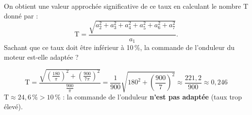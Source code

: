 \documentclass[11pt,a4paper]{article}
\newcommand{\cor}[1]{%
  \begin{tcolorbox}[
    colback=blue!5!white,
    colframe=blue!70!black,
    boxrule=1pt,
    arc=3pt,
    left=4pt, right=4pt, top=3pt, bottom=3pt,
    before skip=2mm, after skip=3mm
  ]
  \color{blue!80!black}#1
  \end{tcolorbox}%
}
\begin{document}
\begin{enumerate}
\begin{enumerate}
On obtient une valeur approchée significative de ce taux en calculant le nombre T donné par :
\[\text{T} = \dfrac{\sqrt{a_2^2+a_3^2+a_4^2+a_5^2+a_6^2+a_7^2}}{a_1}.\]
Sachant que ce taux doit être inférieur à 10\,\%, la commande de l'onduleur du moteur est-elle adaptée ?\\
        \cor{
        $$\text{T} = \frac{\sqrt{\left(\frac{180}{\pi}\right)^2+\left(\frac{900}{7\pi}\right)^2}}{\frac{900}{\pi}}
        = \frac{1}{900}\sqrt{180^2+\left(\frac{900}{7}\right)^2}
        \approx \frac{221{,}2}{900} \approx 0{,}246$$
        $\text{T}\approx24{,}6\,\%>10\,\%$ : la commande de l'onduleur \textbf{n'est pas adaptée} (taux trop élevé).
        }
    \end{enumerate}
\end{enumerate}
\end{document}
